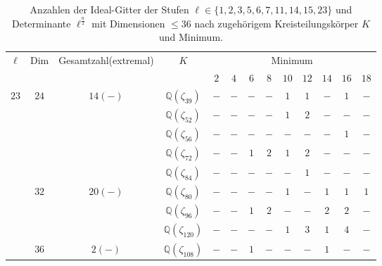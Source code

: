\documentclass[12pt,a4paper,halfparskip,headsepline,bibtotocnumbered]{scrreprt}
\theoremstyle{nummermitklammern}
\theoremstyle{nonumberbreak}
\newcommand{\Q}{\mathbb{Q}}
\begin{document}
\begin{table}
	\centering
	\begin{tabular}{|c|c|c|c|c|c|c|c|c|c|c|c|c|}
		\hline		
		\multirow{2}{*}{$\ell$}	&\multirow{2}{*}{Dim}	&\multirow{2}{*}{Gesamtzahl(extremal)}	&\multirow{2}{*}{$K$}	&\multicolumn{9}{c|}{Minimum}\\ \cline{5-13}
								&						&							&					&$2$	&$4$	&$6$	&$8$	&$10$	&$12$	&$14$	&$16$	&$18$\\ \hline
		\multirow{9}{*}{$23$}	&\multirow{5}{*}{$24$}	&\multirow{5}{*}{$14(-)$}	&$\Q(\zeta_{39})$	&$-$	&$-$	&$-$	&$-$	&$1$	&$1$	&$-$	&$1$	&$-$\\ \cline{4-13}
								&						&							&$\Q(\zeta_{52})$	&$-$	&$-$	&$-$	&$-$	&$1$	&$2$	&$-$	&$-$	&$-$\\ \cline{4-13}
								&						&							&$\Q(\zeta_{56})$	&$-$	&$-$	&$-$	&$-$	&$-$	&$-$	&$-$	&$1$	&$-$\\ \cline{4-13}
								&						&							&$\Q(\zeta_{72})$	&$-$	&$-$	&$1$	&$2$	&$1$	&$2$	&$-$	&$-$	&$-$\\ \cline{4-13}
								&						&							&$\Q(\zeta_{84})$	&$-$	&$-$	&$-$	&$-$	&$-$	&$1$	&$-$	&$-$	&$-$\\ \cline{2-13}
								&\multirow{3}{*}{$32$}	&\multirow{3}{*}{$20(-)$}	&$\Q(\zeta_{80})$	&$-$	&$-$	&$-$	&$-$	&$1$	&$-$	&$1$	&$1$	&$1$\\ \cline{4-13}
								&						&							&$\Q(\zeta_{96})$	&$-$	&$-$	&$1$	&$2$	&$-$	&$-$	&$2$	&$2$	&$-$\\ \cline{4-13}
								&						&							&$\Q(\zeta_{120})$	&$-$	&$-$	&$-$	&$-$	&$1$	&$3$	&$1$	&$4$	&$-$\\ \cline{2-13}
								&$36$					&$2(-)$						&$\Q(\zeta_{108})$	&$-$	&$-$	&$1$	&$-$	&$-$	&$-$	&$1$	&$-$	&$-$\\ \hline
	\end{tabular}
	\caption{Anzahlen der Ideal-Gitter der Stufen $\ell \in \lbrace 1,2,3,5,6,7,11,14,15,23 \rbrace$ und Determinante $\ell^\frac{n}{2}$ mit Dimensionen $\leq 36$ nach zugehörigem Kreisteilungskörper $K$ und Minimum.}
\end{table}
\end{document}
